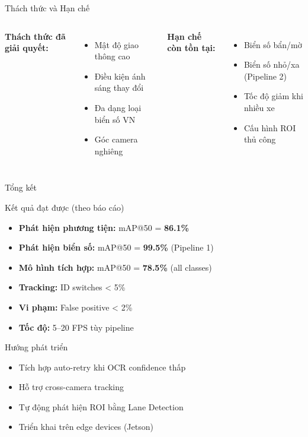 \begin{frame}{Thách thức và Hạn chế}
    \begin{columns}
        \textbf{Thách thức đã giải quyết:}
        \begin{itemize}
            \item Mật độ giao thông cao
            \item Điều kiện ánh sáng thay đổi
            \item Đa dạng loại biển số VN
            \item Góc camera nghiêng
        \end{itemize}

        \textbf{Hạn chế còn tồn tại:}
        \begin{itemize}
            \item Biển số bẩn/mờ
            \item Biển số nhỏ/xa (Pipeline 2)
            \item Tốc độ giảm khi nhiều xe
            \item Cấu hình ROI thủ công
        \end{itemize}
    \end{columns}
\end{frame}

\begin{frame}{Tổng kết}
    \begin{alertblock}{Kết quả đạt được (theo báo cáo)}
    \begin{itemize}
        \item \textbf{Phát hiện phương tiện:} mAP@50 = \textbf{86.1\%}
        \item \textbf{Phát hiện biển số:} mAP@50 = \textbf{99.5\%} (Pipeline 1)
        \item \textbf{Mô hình tích hợp:} mAP@50 = \textbf{78.5\%} (all classes)
        \item \textbf{Tracking:} ID switches < 5\%
        \item \textbf{Vi phạm:} False positive < 2\%
        \item \textbf{Tốc độ:} 5--20 FPS tùy pipeline
    \end{itemize}
    \end{alertblock}

    \begin{block}{Hướng phát triển}
    \begin{itemize}
        \item Tích hợp auto-retry khi OCR confidence thấp
        \item Hỗ trợ cross-camera tracking
        \item Tự động phát hiện ROI bằng Lane Detection
        \item Triển khai trên edge devices (Jetson)
    \end{itemize}
    \end{block}
\end{frame}


